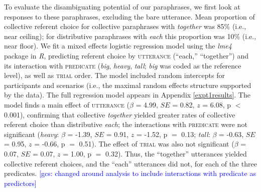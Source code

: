 \documentclass[linguex]{sp}
\newcommand{\ndg}[1]{\textcolor{Green}{[ndg: #1]}}
\newcommand{\gcs}[1]{\textcolor{blue}{[gcs: #1]}}
\begin{document}
To evaluate the disambiguating potential of our paraphrases, we first look at responses to these paraphrases, excluding the bare utterance. Mean proportion of collective referent choice for collective paraphrases with \emph{together} was 85\% (i.e., near ceiling); for distributive paraphrases with \emph{each} this proportion was 10\% (i.e., near floor). We fit a mixed effects logistic regression model \citep{baayenetal2008} using the \emph{lme4} package \citep{batesetal2014} in \emph{R}, predicting referent choice by \textsc{utterance} (``each,'' ``together'') and its interaction with \textsc{predicate} (\emph{big}, \emph{heavy}, \emph{tall}; \emph{big} was coded as the reference level), as well as \textsc{trial} order.  The model included random intercepts for participants and scenarios (i.e., the maximal random effects structure supported by the data). The full regression model appears in Appendix \ref{expt1results}. The model finds a main effect of \textsc{utterance} ($\beta$ = 4.99, $SE$ = 0.82, $z$ = 6.08, p $<$ 0.001), confirming that collective \emph{together} yielded greater rates of collective referent choice than distributive \emph{each}; the interactions with \textsc{predicate} were not significant (\emph{heavy}: $\beta$ = -1.39, $SE$ = 0.91, $z$ = -1.52, p $=$ 0.13; \emph{tall}: $\beta$ = -0.63, $SE$ = 0.95, $z$ = -0.66, p $=$ 0.51). The effect of \textsc{trial} was also not significant ($\beta$ = 0.07, $SE$ = 0.07, $z$ = 1.00, p $=$ 0.32). Thus, the ``together'' utterances yielded collective referent choices, and the ``each'' utterances did not, for each of the three predicates.
\gcs{changed around analysis to include interactions with predicate as predictors}
\end{document}
